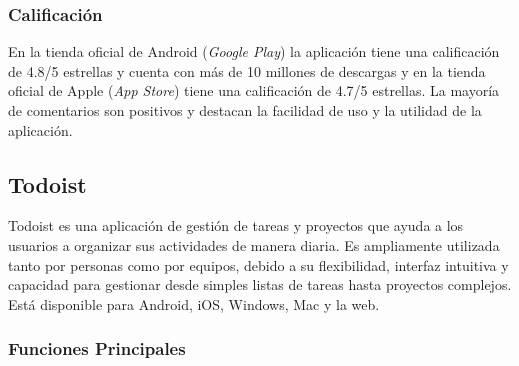 \subsubsection{Calificación}
\label{subsec:calificacion}
En la tienda oficial de Android (\textit{Google Play}) la aplicación tiene una calificación de 4.8/5 estrellas y cuenta con más de 
10 millones de descargas y en la tienda oficial de Apple (\textit{App Store}) tiene una calificación de 4.7/5 estrellas. La mayoría de comentarios
son positivos y destacan la facilidad de uso y la utilidad de la aplicación.

\clearpage

\subsection{Todoist}
\label{sec:todoist}
Todoist es una aplicación de gestión de tareas y proyectos que ayuda a los usuarios a organizar sus actividades de manera diaria. 
Es ampliamente utilizada tanto por personas como por equipos, debido a su flexibilidad, interfaz intuitiva y capacidad para gestionar
desde simples listas de tareas hasta proyectos complejos. Está disponible para Android, iOS, Windows, Mac y la web. \cite{todoist2025}

\subsubsection{Funciones Principales}
\label{subsec:funciones_todoist}

